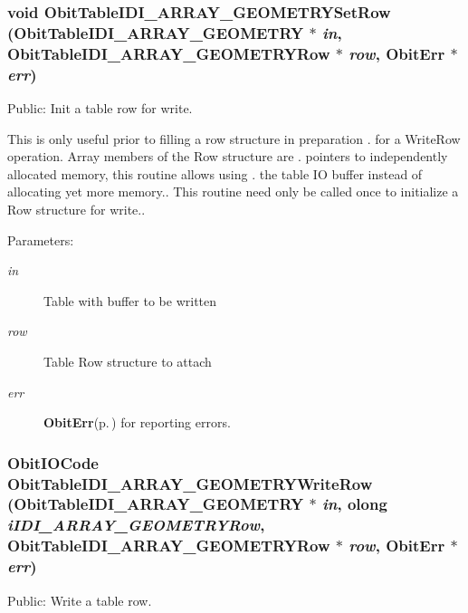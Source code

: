 \subsubsection{\setlength{\rightskip}{0pt plus 5cm}void Obit\-Table\-IDI\_\-ARRAY\_\-GEOMETRYSet\-Row ({\bf Obit\-Table\-IDI\_\-ARRAY\_\-GEOMETRY} $\ast$ {\em in}, {\bf Obit\-Table\-IDI\_\-ARRAY\_\-GEOMETRYRow} $\ast$ {\em row}, {\bf Obit\-Err} $\ast$ {\em err})}\label{ObitTableIDI__ARRAY__GEOMETRY_8h_a19}


Public: Init a table row for write. 

This is only useful prior to filling a row structure in preparation . for a Write\-Row operation. Array members of the Row structure are . pointers to independently allocated memory, this routine allows using . the table IO buffer instead of allocating yet more memory.. This routine need only be called once to initialize a Row structure for write.. \begin{Desc}
\item[Parameters:]
\begin{description}
\item[{\em in}]Table with buffer to be written \item[{\em row}]Table Row structure to attach \item[{\em err}]{\bf Obit\-Err}{\rm (p.\,\pageref{structObitErr})} for reporting errors. \end{description}
\end{Desc}
\subsubsection{\setlength{\rightskip}{0pt plus 5cm}Obit\-IOCode Obit\-Table\-IDI\_\-ARRAY\_\-GEOMETRYWrite\-Row ({\bf Obit\-Table\-IDI\_\-ARRAY\_\-GEOMETRY} $\ast$ {\em in}, {\bf olong} {\em i\-IDI\_\-ARRAY\_\-GEOMETRYRow}, {\bf Obit\-Table\-IDI\_\-ARRAY\_\-GEOMETRYRow} $\ast$ {\em row}, {\bf Obit\-Err} $\ast$ {\em err})}\label{ObitTableIDI__ARRAY__GEOMETRY_8h_a20}


Public: Write a table row. 

